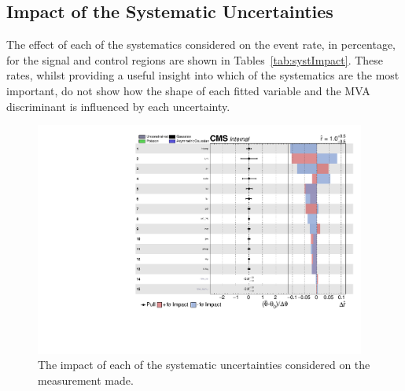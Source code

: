 \subsection{Impact of the Systematic Uncertainties}\label{sec:uncertainitiesImpact}
The effect of each of the systematics considered on the event rate, in percentage, for the signal and control regions are shown in Tables~\ref{tab:systImpact}.
These rates, whilst providing a useful insight into which of the systematics are the most important, do not show how the shape of each fitted variable and the MVA discriminant is influenced by each uncertainty.

\begin{figure}[htbp]
\begin{center}
\includegraphics[width=0.97\textwidth]{figs/results/systematicsImpact.pdf}
\caption{The impact of each of the systematic uncertainties considered on the measurement made.}
\label{fig:systematicsPull}
\end{center}
\end{figure}


